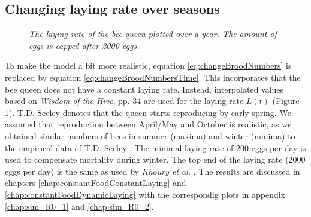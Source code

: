 	\subsection{Changing laying rate over seasons}
		\begin{figure}
			\centering
			\caption{\textit{The laying rate of the bee queen plotted over a year. The amount of eggs is capped after 2000 eggs.}}
			\label{fig:dynLayingRate}
		\end{figure}
		
		
		To make the model a bit more realistic, equation \ref{eq:changeBroodNumbers} is replaced by equation \ref{eq:changeBroodNumbersTime}. This incorporates that the bee queen does not have a constant laying rate. Instead, interpolated values based on \textit{Wisdom of the Hive}, pp. 34 \cite{seeley95} are used for the laying rate $L(t)$ (Figure \ref{fig:dynLayingRate}). T.D. Seeley denotes that the queen starts reproducing by early spring. We assumed that reproduction between April/May and October is realistic, as we obtained similar numbers of bees in summer (maxima) and winter (minima) to the empirical data of T.D. Seeley \cite{seeley95}. The minimal laying rate of 200 eggs per day is used to compensate mortality during winter. The top end of the laying rate (2000 eggs per day) is the same as used by \textit{Khoury et al.} \cite{khoury13}. The results are discussed in chapters \ref{chap:constantFoodConstantLaying} and \ref{chap:constantFoodDynamicLaying} with the correspondig plots in appendix \ref{chap:sim_R0_1} and \ref{chap:sim_R0_2}.
		
